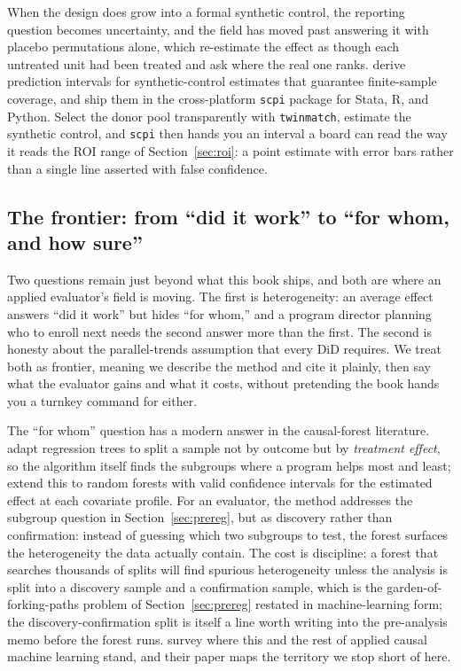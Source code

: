 \documentclass[
    a4paper,
    fontsize=10pt,
    twoside=true,
    numbers=noenddot,
]{kaobook}
\begin{document}
When the design does grow into a formal synthetic control, the reporting question becomes uncertainty, and the field has moved past answering it with placebo permutations alone, which re-estimate the effect as though each untreated unit had been treated and ask where the real one ranks. \textcite{cattaneo2021prediction} derive prediction intervals for synthetic-control estimates that guarantee finite-sample coverage, and \textcite{cattaneo2025scpi} ship them in the cross-platform \texttt{scpi} package for Stata, R, and Python. Select the donor pool transparently with \texttt{twinmatch}, estimate the synthetic control, and \texttt{scpi} then hands you an interval a board can read the way it reads the ROI range of Section~\ref{sec:roi}: a point estimate with error bars rather than a single line asserted with false confidence.

\subsection{The frontier: from ``did it work'' to ``for whom, and how sure''}\label{ch08-sec:frontier}
Two questions remain just beyond what this book ships, and both are where an applied evaluator's field is moving. The first is heterogeneity: an average effect answers \enquote{did it work} but hides \enquote{for whom,} and a program director planning who to enroll next needs the second answer more than the first. The second is honesty about the parallel-trends assumption that every DiD requires. We treat both as frontier, meaning we describe the method and cite it plainly, then say what the evaluator gains and what it costs, without pretending the book hands you a turnkey command for either.

The \enquote{for whom} question has a modern answer in the causal-forest literature. \textcite{athey2016recursive} adapt regression trees to split a sample not by outcome but by \emph{treatment effect}, so the algorithm itself finds the subgroups where a program helps most and least; \textcite{wager2018forests} extend this to random forests with valid confidence intervals for the estimated effect at each covariate profile. For an evaluator, the method addresses the subgroup question in Section~\ref{sec:prereg}, but as discovery rather than confirmation: instead of guessing which two subgroups to test, the forest surfaces the heterogeneity the data actually contain. The cost is discipline: a forest that searches thousands of splits will find spurious heterogeneity unless the analysis is split into a discovery sample and a confirmation sample, which is the garden-of-forking-paths problem of Section~\ref{sec:prereg} restated in machine-learning form; the discovery-confirmation split is itself a line worth writing into the pre-analysis memo before the forest runs. \textcite{athey2017state} survey where this and the rest of applied causal machine learning stand, and their paper maps the territory we stop short of here.
\end{document}
